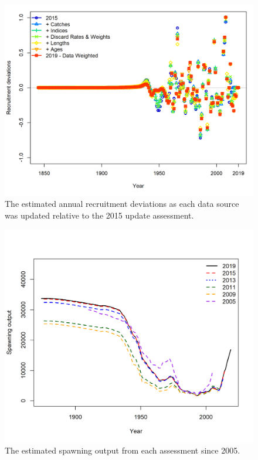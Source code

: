 \documentclass[12pt,]{article}
\begin{document}
\FloatBarrier

\begin{figure}
\centering
\includegraphics{Figures/data_recdevs.png}
\caption{The estimated annual recruitment deviations as each data source
was updated relative to the 2015 update assessment.
\label{fig:recdev_data}}
\end{figure}

\FloatBarrier

\begin{figure}
\centering
\includegraphics{Figures/Assessment_History.png}
\caption{The estimated spawning output from each assessment since 2005.
\label{fig:historical_analysis}}
\end{figure}
\end{document}
